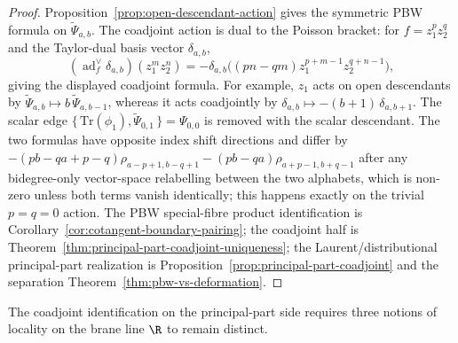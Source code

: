 \documentclass[11pt]{memoir}
\begin{document}
\begin{proof}
  Proposition~\ref{prop:open-descendant-action} gives the symmetric
  PBW formula on $\widetilde\Psi_{a,b}$. The coadjoint action is
  dual to the Poisson bracket: for $f=z_1^pz_2^q$ and the Taylor-dual
  basis vector $\delta_{a,b}$,
  $$(\operatorname{ad}^{\vee}_f\delta_{a,b})(z_1^mz_2^n)
    =-\delta_{a,b}\bigl((pn-qm)z_1^{p+m-1}z_2^{q+n-1}\bigr),$$
  giving the displayed coadjoint formula. For example, $z_1$ acts on
  open descendants by
  $\widetilde\Psi_{a,b}\mapsto b\,\widetilde\Psi_{a,b-1}$, whereas it
  acts coadjointly by $\delta_{a,b}\mapsto-(b+1)\,\delta_{a,b+1}$. The
  scalar edge
  $\{\,\mathrm{Tr}(\phi_1),\widetilde\Psi_{0,1}\,\}=\Psi_{0,0}$ is
  removed with the scalar descendant. The two formulas have opposite
  index shift directions and differ by
  $-(pb-qa+p-q)\rho_{a-p+1,b-q+1}-(pb-qa)\rho_{a+p-1,b+q-1}$
  after any bidegree-only vector-space relabelling between the two
  alphabets, which is non-zero
	  unless both terms vanish identically; this happens exactly on the
  trivial $p=q=0$ action. The PBW special-fibre product identification
  is Corollary~\ref{cor:cotangent-boundary-pairing}; the coadjoint
  half is Theorem~\ref{thm:principal-part-coadjoint-uniqueness}; the
  Laurent/distributional principal-part realization is
  Proposition~\ref{prop:principal-part-coadjoint} and the separation
  Theorem~\ref{thm:pbw-vs-deformation}.
\end{proof}

The coadjoint identification on the principal-part side requires
three notions of locality on the brane line $\R$ to remain distinct.
\end{document}

